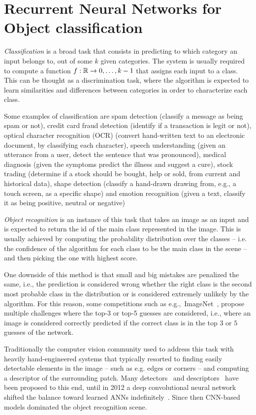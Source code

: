 \chapter{Recurrent Neural Networks for Object classification}\label{sec:renet}

\emph{Classification} is a broad task that consists in predicting to which
category an input belongs to, out of some $k$ given categories. The system is
usually required to compute a function $f: \mathbb{R} \to {0, \dots, k-1}$ that
assigns each input to a class. This can be thought as a discrimination task,
where the algorithm is expected to learn similarities and differences between
categories in order to characterize each class.

Some examples of classification are spam detection (classify a message as being
spam or not), credit card fraud detection (identify if a transaction is legit
or not), optical character recognition (OCR) (convert hand-written text to an
electronic document, by classifying each character), speech understanding
(given an utterance from a user, detect the sentence that was pronounced),
medical diagnosis (given the symptoms predict the illness and suggest a cure),
stock trading (determine if a stock should be bought, help or sold, from
current and historical data), shape detection (classify a hand-drawn drawing
from, e.g., a touch screen, as a specific shape) and emotion recognition (given
a text, classify it as being positive, neutral or negative)

\emph{Object recognition} is an instance of this task that takes an image as an
input and is expected to return the id of the main class represented in the
image. This is usually achieved by computing the probability distribution over
the classes -- i.e. the confidence of the algorithm for each class to be the
main class in the scene -- and then picking the one with highest score.

One downside of this method is that small and big mistakes are penalized the
same, i.e., the prediction is considered wrong whether the right class is the
second most probable class in the distribution or is considered extremely
unlikely by the algorithm. For this reason, some competitions such as
e.g.,~ImageNet~\citep{imagenet_cvpr09, ILSVRCarxiv14}, propose multiple
challenges where the top-3 or top-5 guesses are considered, i.e., where an
image is considered correctly predicted if the correct class is in the top
$3$ or $5$ guesses of the network.

Traditionally the computer vision community used to address this task with
heavily hand-engineered systems that typically resorted to finding easily
detectable elements in the image -- such as e.g. edges or corners -- and
computing a descriptor of the surrounding patch. Many detectors~\cite{
dufournaud2000matching,harris1988combined,mikolajczyk2001indexing,
lowe2004distinctive,mikolajczyk2005performance} and descriptors~\cite{
lowe1999object,mikolajczyk2005performance,belongie2002shape} have been proposed
to this end, until in 2012 a deep convolutional neural network shifted the
balance toward learned ANNs indefinitely~\citep{Krizhevsky-2012}. Since then
CNN-based models dominated the object recognition scene.

